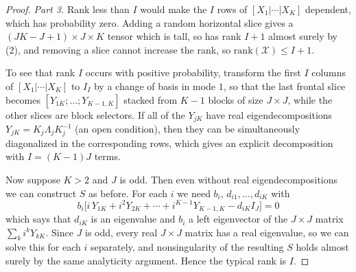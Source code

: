   \begin{proof}
    \textit{Part 3.} Rank less than $I$ would make the $I$ rows of $[X_1 | \cdots | X_K]$ dependent, which has probability zero. Adding a random horizontal slice gives a $(JK - J + 1) \times J \times K$ tensor which is tall, so has rank $I + 1$ almost surely by (2), and removing a slice cannot increase the rank, so $\mathrm{rank}(\mathcal{X}) \leq I + 1$.

    To see that rank $I$ occurs with positive probability, transform the first $I$ columns of $[X_1 | \cdots | X_K]$ to $I_I$ by a change of basis in mode $1$, so that the last frontal slice becomes $[Y_{1K}; \ldots; Y_{K-1,K}]$ stacked from $K - 1$ blocks of size $J \times J$, while the other slices are block selectors. If all of the $Y_{jK}$ have real eigendecompositions $Y_{jK} = K_j \Lambda_j K_j^{-1}$ (an open condition), then they can be simultaneously diagonalized in the corresponding rows, which gives an explicit decomposition with $I = (K-1) J$ terms.

    Now suppose $K > 2$ and $J$ is odd. Then even without real eigendecompositions we can construct $S$ as before. For each $i$ we need $b_i$, $d_{i1}, \ldots, d_{iK}$ with
    \begin{equation}
      b_i \Big[ i \, Y_{1K} + i^2 Y_{2K} + \cdots + i^{K-1} Y_{K-1,K} - d_{iK} I_J \Big] = 0
    \end{equation}
    which says that $d_{iK}$ is an eigenvalue and $b_i$ a left eigenvector of the $J \times J$ matrix $\sum_k i^k Y_{kK}$. Since $J$ is odd, every real $J \times J$ matrix has a real eigenvalue, so we can solve this for each $i$ separately, and nonsingularity of the resulting $S$ holds almost surely by the same analyticity argument. Hence the typical rank is $I$.
  \end{proof}

